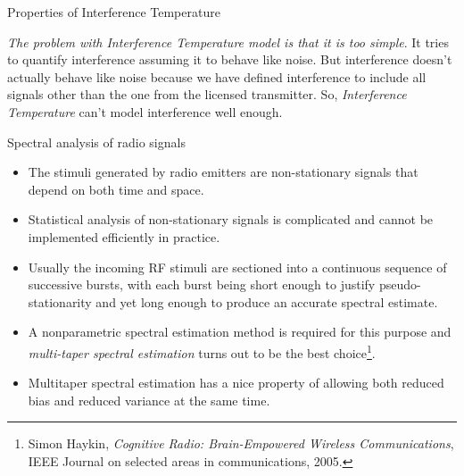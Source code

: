 \documentclass[mathserif]{beamer}
\begin{document}
\begin{frame}{Properties of Interference Temperature}

\emph{The problem with Interference Temperature model is that it is too simple}. It tries to quantify interference assuming it to behave like noise. But interference doesn't actually behave like noise because we have defined interference to include all signals other than the one from the licensed transmitter. So, \emph{Interference Temperature} can't model interference well enough.

\end{frame}




\begin{frame}{Spectral analysis of radio signals}


\begin{itemize}

	\pause
	\item The stimuli generated by radio emitters are non-stationary signals that depend on both time and space.
	\pause
	\item Statistical analysis of non-stationary signals is complicated and cannot be implemented efficiently in practice. 
	\pause
	\item Usually the incoming RF stimuli are sectioned into a continuous sequence of successive bursts, with each burst being short enough to justify pseudo-stationarity and yet long enough to produce an accurate spectral estimate.
	\pause
	\item A nonparametric spectral estimation method is required for this purpose and \emph{multi-taper spectral estimation} turns out to be the best choice\footnote{Simon Haykin, \emph{Cognitive Radio: Brain-Empowered Wireless Communications}, IEEE Journal on selected areas in communications, 2005.}. 
	\pause
	\item Multitaper spectral estimation has a nice property of allowing both reduced bias and reduced variance at the same time.

\end{itemize}
\end{frame}
\end{document}
